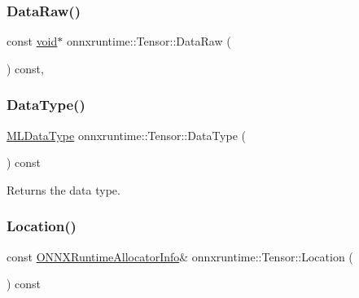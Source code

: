 \mbox{\label{classonnxruntime_1_1Tensor_a13d387f046da54820c6014e9e73b0da6}} 
\subsubsection{\texorpdfstring{Data\+Raw()}{DataRaw()}\hspace{0.1cm}{\footnotesize\ttfamily [2/2]}}
{\footnotesize\ttfamily const \mbox{\hyperlink{mlasi_8h_a88f941d423cb2a819b70a1358982b1a6}{void}}$\ast$ onnxruntime\+::\+Tensor\+::\+Data\+Raw (\begin{DoxyParamCaption}{ }\end{DoxyParamCaption}) const\hspace{0.3cm}{\ttfamily [inline]}, {\ttfamily [noexcept]}}

\mbox{\label{classonnxruntime_1_1Tensor_a1e4c9fc0c4ad68ca450e2e7d4aec0c43}} 
\subsubsection{\texorpdfstring{Data\+Type()}{DataType()}}
{\footnotesize\ttfamily \mbox{\hyperlink{namespaceonnxruntime_ad77d0a6e838ec7da5dc35fed5ee66b49}{M\+L\+Data\+Type}} onnxruntime\+::\+Tensor\+::\+Data\+Type (\begin{DoxyParamCaption}{ }\end{DoxyParamCaption}) const\hspace{0.3cm}{\ttfamily [inline]}}

Returns the data type. \mbox{\label{classonnxruntime_1_1Tensor_a6135bef01259279436c85e7c698bad8b}} 
\subsubsection{\texorpdfstring{Location()}{Location()}}
{\footnotesize\ttfamily const \mbox{\hyperlink{structONNXRuntimeAllocatorInfo}{O\+N\+N\+X\+Runtime\+Allocator\+Info}}\& onnxruntime\+::\+Tensor\+::\+Location (\begin{DoxyParamCaption}{ }\end{DoxyParamCaption}) const\hspace{0.3cm}{\ttfamily [inline]}}

